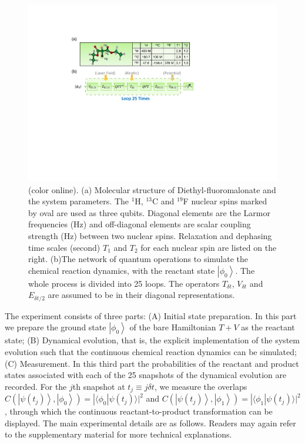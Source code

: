\documentclass[twocolumn,showpacs,twoside,10pt,prl]{revtex4}
\newcommand{\la}{\langle}
\newcommand{\ra}{\rangle}
\begin{document}
\begin{figure}[htb]
\begin{center}
\includegraphics[width= 1\columnwidth]{structure.pdf}
\end{center}
\setlength{\abovecaptionskip}{-0.35cm}
\caption{\footnotesize{(color online). (a) Molecular structure of Diethyl-fluoromalonate and the system parameters.
The $^1$H, $^{13}$C and $^{19}$F nuclear spins marked by oval are used as three qubits.
Diagonal elements are the Larmor frequencies (Hz) and
off-diagonal elements are scalar coupling strength (Hz) between two nuclear spins.
Relaxation and dephasing time scales (second) $T_1$ and $T_2$ for each nuclear spin are listed on the right.
(b)The network of quantum operations to simulate the chemical reaction dynamics, with the reactant state $\left\vert \phi_{0} \right\rangle$.
The whole process is divided into 25 loops. The operators $T_{\delta t}$, $V_{\delta t}$ and $E_{\delta t/2}$ are assumed to be in their
diagonal representations.}}\label{structure}
\end{figure}


The experiment consists of three parts: (A) Initial state preparation. In this part we prepare the ground state $\left\vert \phi_{0} \right\rangle$ of the bare Hamiltonian $T+V$ as the reactant state; (B) Dynamical evolution, that is, the explicit implementation of the system evolution such that the continuous chemical reaction dynamics can be simulated; (C) Measurement. In this third part the probabilities of the reactant and product states associated with each of the 25 snapshots of the dynamical evolution are recorded.  For the $j$th snapshot at $t_j\equiv j\delta t$, we measure the overlaps $C(\left\vert \psi(t_j) \right\rangle,\left\vert \phi_{0} \right\rangle)=| \la\phi_0|\psi(t_j)\ra |^2$ and $C(\left\vert \psi(t_j) \right\rangle,\left\vert \phi_{1} \right\rangle)=
|\la\phi_1|\psi(t_j)\ra |^2$, through which the continuous reactant-to-product transformation can be displayed. The main experimental details are as follows. Readers may again refer to the supplementary material \cite{supplement} for more technical explanations.
\end{document}
